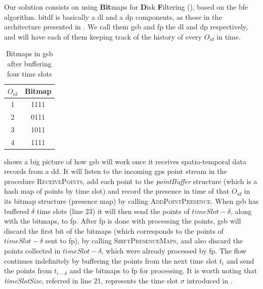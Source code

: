 Our solution consists on using \textbf{Bit}maps for \textbf{D}isk \textbf{F}iltering (\label{acro:bitdf}),
based on the \ac{bfe} algorithm. \ac{bitdf} is basically a \ac{dl} and a \ac{dp} components, as those in the
architecture presented in . We call them \ac{gsb} and \ac{fp} the \ac{dl} and \ac{dp}
respectively, and will have each of them keeping track of the history of every $O_{id}$ in time.

\begin{table}[h!]
    \renewcommand{\arraystretch}{1.3}
    \caption{Bitmaps in \ac{gsb} after buffering four time slots}
    \label{tab:bitmaps}
    \centering
    \begin{tabular}{c | c}
        \toprule
        $O_{id}$ &   Bitmap\\
        \toprule
        1        &   1111\\
        \bottomrule
        2        &   0111\\
        \bottomrule
        3        &   1011\\
        \bottomrule
        4        &   1111\\
        \bottomrule
    \end{tabular}
\end{table}

 shows a big picture of how \ac{gsb} will work once it receives spatio-temporal data records from a
\ac{dd}. It will listen to the incoming \ac{gps} point stream in the procedure \textsc{ReceivePoints}, add each point to
the \textit{pointBuffer} structure (which is a hash map of points by time slot) and record the presence in time of that
$O_{id}$ in its bitmap structure (presence map) by calling \textsc{AddPointPresence}. When \ac{gsb} has buffered
$\delta$ time slots (line 23) it will then send the points of $timeSlot - \delta$, along with the bitmaps, to \ac{fp}.
After \ac{fp} is done with processing the points, \ac{gsb} will discard the first bit of the bitmaps (which corresponds
to the points of $timeSlot - \delta$ sent to \ac{fp}), by calling \textsc{ShiftPresenceMaps}, and also discard the
points collected in $timeSlot - \delta$, which were already processed by \ac{fp}. The flow continues indefinitely by
buffering the points from the next time slot $t_i$ and send the points from $t_{i - \delta}$ and the bitmaps to \ac{fp}
for processing. It is worth noting that \textit{timeSlotSize}, referred in line 21, represents the time slot $\sigma$
introduced in .

